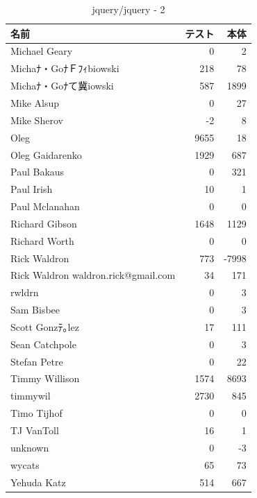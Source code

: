 \begin{table}[htb]
\begin{center}
\caption{jquery/jquery - 2}
\begin{tabular}{|l|r|r|} \hline 
名前 & テスト & 本体 \\ \hline \hline
Michael Geary & 0 & 2\\ \hline
Michaﾅ・GoﾅＦﾌｨbiowski & 218 & 78\\ \hline
Michaﾅ・Goﾅて冀iowski & 587 & 1899\\ \hline
Mike Alsup & 0 & 27\\ \hline
Mike Sherov & -2 & 8\\ \hline
Oleg & 9655 & 18\\ \hline
Oleg Gaidarenko & 1929 & 687\\ \hline
Paul Bakaus & 0 & 321\\ \hline
Paul Irish & 10 & 1\\ \hline
Paul Mclanahan & 0 & 0\\ \hline
Richard Gibson & 1648 & 1129\\ \hline
Richard Worth & 0 & 0\\ \hline
Rick Waldron & 773 & -7998\\ \hline
Rick Waldron waldron.rick@gmail.com & 34 & 171\\ \hline
rwldrn & 0 & 3\\ \hline
Sam Bisbee & 0 & 3\\ \hline
Scott Gonzﾃ｡lez & 17 & 111\\ \hline
Sean Catchpole & 0 & 3\\ \hline
Stefan Petre & 0 & 22\\ \hline
Timmy Willison & 1574 & 8693\\ \hline
timmywil & 2730 & 845\\ \hline
Timo Tijhof & 0 & 0\\ \hline
TJ VanToll & 16 & 1\\ \hline
unknown & 0 & -3\\ \hline
wycats & 65 & 73\\ \hline
Yehuda Katz & 514 & 667\\ \hline
\end{tabular}
\end{center}
\end{table}

